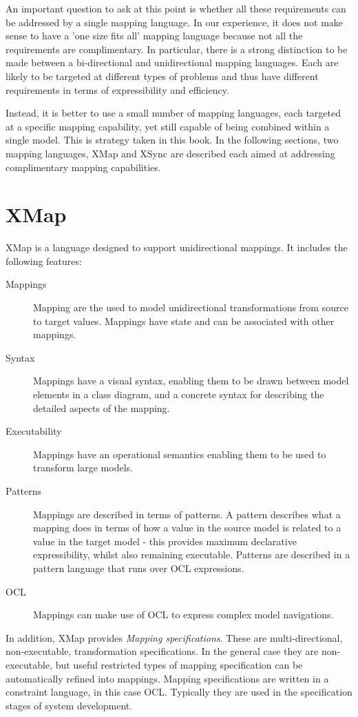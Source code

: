 An important question to ask at this point is whether all these
requirements can be addressed by a single mapping language. In our
experience, it does not make sense to have a 'one size fits all'
mapping language because not all the requirements are
complimentary. In particular, there is a strong distinction to be
made between a bi-directional and unidirectional mapping
languages. Each are likely to be targeted at different types of
problems and thus have different requirements in terms of
expressibility and efficiency.

Instead, it is better to use a small number of mapping languages,
each targeted at a specific mapping capability, yet still capable
of being combined within a single model. This is strategy taken in
this book. In the following sections, two mapping languages, XMap
and XSync are described each aimed at addressing complimentary
mapping capabilities.

\section{XMap}

XMap is a language designed to support unidirectional mappings. It
includes the following features:

\begin{description}
\item [Mappings] Mapping are the used to model unidirectional
transformations from source to target values. Mappings have state
and can be associated with other mappings. \item[Syntax] Mappings
have a visual syntax, enabling them to be drawn between model
elements in a class diagram, and a concrete syntax for describing
the detailed aspects of the mapping. \item[Executability] Mappings
have an operational semantics enabling them to be used to
transform large models. \item[Patterns] Mappings are described in
terms of patterns. A pattern describes what a mapping does in
terms of how a value in the source model is related to a value in
the target model - this provides maximum declarative
expressibility, whilst also remaining executable. Patterns are
described in a pattern language that runs over OCL expressions.
\item[OCL] Mappings can make use of OCL to express complex model
navigations.
\end{description}

In addition, XMap provides {\em Mapping specifications}. These are
multi-directional, non-executable, transformation specifications.
In the general case they are non-executable, but useful restricted
types of mapping specification can be automatically refined into
mappings. Mapping specifications are written in a constraint
language, in this case OCL. Typically they are used in the
specification stages of system development.

